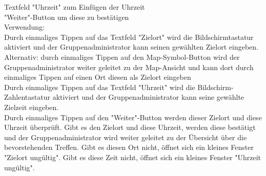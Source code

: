 Textfeld "Uhrzeit" zum Einfügen der Uhrzeit\\
"Weiter"-Button um diese zu bestätigen\\
[Kleinüberschrift]Verwendung:\\
Durch einmaliges Tippen auf das Textfeld "Zielort" wird die Bildschirmtastatur aktiviert und der Gruppenadministrator kann seinen gewählten Zielort eingeben.\\
Alternativ: durch einmaliges Tippen auf den Map-Symbol-Button wird der Gruppenadministrator weiter geleitet zu der Map-Ansicht und kann dort durch einmaliges Tippen auf einen Ort diesen als Zielort eingeben\\
Durch einmaliges Tippen auf das Textfeld "Uhrzeit" wird die Bildschirm-Zahlentastatur aktiviert und der Gruppenadministrator kann seine gewählte Zielzeit eingeben.\\
Durch einmaliges Tippen auf den "Weiter"-Button werden dieser Zielort und diese Uhrzeit überprüft. Gibt es den Zielort und diese Uhrzeit, werden diese bestätigt und der Gruppenadministrator wird weiter geleitet zu der Übersicht über die bevorstehenden Treffen. Gibt es diesen Ort nicht, öffnet sich ein kleines Fenster "Zielort ungültig". Gibt es diese Zeit nicht, öffnet sich ein kleines Fenster "Uhrzeit ungültig".\\ \\

